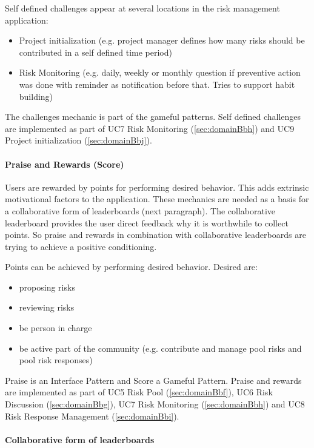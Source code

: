 Self defined challenges appear at several locations in the risk management application:
\begin{itemize}
	\item Project initialization (e.g. project manager defines how many risks should be contributed in a self defined time period)
	\item Risk Monitoring (e.g. daily, weekly or monthly question if preventive action was done with reminder as notification before that. Tries to support habit building)
\end{itemize}

The challenges mechanic is part of the gameful patterns. 
Self defined challenges are implemented as part of \ac{UC}7 Risk Monitoring (\ref{sec:domainBbh}) and \ac{UC}9 Project initialization (\ref{sec:domainBbj}).

\paragraph*{Praise and Rewards (Score)}

Users are rewarded by points for performing desired behavior. This adds extrinsic motivational factors to the application. These mechanics are needed as a basis for a collaborative form of leaderboards (next paragraph). The collaborative leaderboard provides the user direct feedback why it is worthwhile to collect points. So praise and rewards in combination with collaborative leaderboards are trying to achieve a positive conditioning.

Points can be achieved by performing desired behavior. Desired are:
\begin{itemize}
	\item proposing risks
	\item reviewing risks
	\item be person in charge
	\item be active part of the community (e.g. contribute and manage pool risks and pool risk responses)
\end{itemize}

Praise is an Interface Pattern and Score a Gameful Pattern.
Praise and rewards are implemented as part of \ac{UC}5 Risk Pool (\ref{sec:domainBbf}), \ac{UC}6 Risk Discussion (\ref{sec:domainBbg}), \ac{UC}7 Risk Monitoring (\ref{sec:domainBbh}) and \ac{UC}8 Risk Response Management (\ref{sec:domainBbi}).

\paragraph*{Collaborative form of leaderboards}


